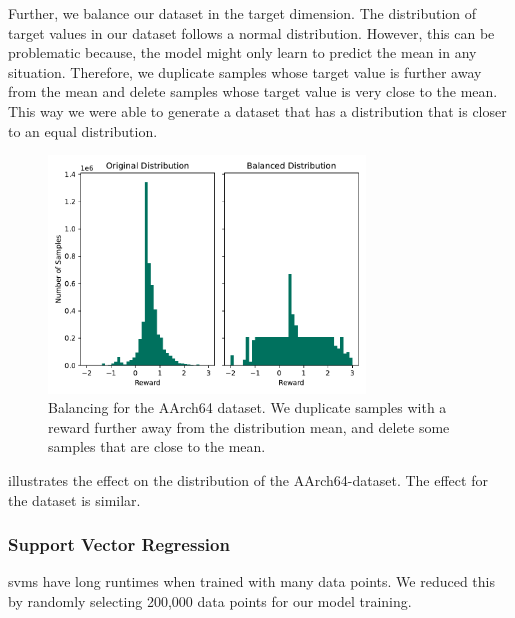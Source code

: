 Further, we balance our dataset in the target dimension.
The distribution of target values in our dataset follows a normal distribution.
However, this can be problematic because, the model might only learn to predict the mean in any situation.
Therefore, we duplicate samples whose target value is further away from the mean and delete samples whose target value is very close to the mean.
This way we were able to generate a dataset that has a distribution that is closer to an equal distribution.
\begin{figure}
    \centering
    \includegraphics[width=0.75\textwidth]{img/balanced-supervised-dataset-rpi.pdf}
    \caption[Balancing for the AArch64 Dataset]{Balancing for the AArch64 dataset. 
    We duplicate samples with a reward further away from the distribution mean, and delete some samples that are close to the mean.}
    \label{fig:eval:balanced-dataset}
\end{figure}
 illustrates the effect on the distribution of the AArch64-dataset.
The effect for the \aurora dataset is similar.

\subsubsection{Support Vector Regression}
\label{sec:eval:svm}
\acp{svm} have long runtimes when trained with many data points.
We reduced this by randomly selecting 200,000 data points for our model training.

